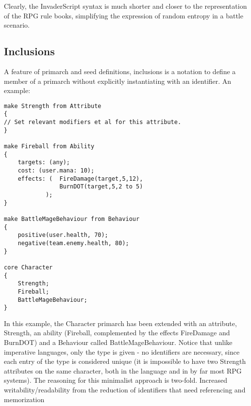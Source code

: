 
Clearly, the InvaderScript syntax is much shorter and closer to the representation of the RPG rule books, simplifying the expression of random entropy  in a battle scenario.

\subsection{Inclusions}
A feature of primarch and seed definitions, inclusions  is a notation to define a member of a primarch without explicitly instantiating with an identifier. An example:
\begin{lstlisting}
make Strength from Attribute
{
// Set relevant modifiers et al for this attribute.
}

make Fireball from Ability
{
	targets: (any);
	cost: (user.mana: 10);
	effects: (	FireDamage(target,5,12),
				BurnDOT(target,5,2 to 5)
			);
}

make BattleMageBehaviour from Behaviour
{
	positive(user.health, 70);
	negative(team.enemy.health, 80);
}

core Character
{
    Strength;
    Fireball;
    BattleMageBehaviour;
}
\end{lstlisting}

In this example, the Character primarch has been extended with an attribute, Strength, an ability (Fireball, complemented by the effects FireDamage and BurnDOT) and a Behaviour called BattleMageBehaviour. Notice that unlike imperative languages, only the type is given - no identifiers are necessary, since each entry of the type is considered unique (it is impossible to have two Strength attributes on the same character, both in the language and in by far most RPG systems). The reasoning for this minimalist approach is two-fold. Increased writability/readability from the reduction of identifiers that need referencing and memorization